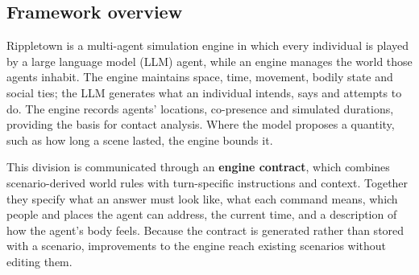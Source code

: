 %
%
%
%
%

\subsection{Framework overview}
\label{sec:methods:overview}

Rippletown is a multi-agent simulation engine in which every individual is played by a large language model (LLM) agent, while an engine manages the world those agents inhabit. The engine maintains space, time, movement, bodily state and social ties; the LLM generates what an individual intends, says and attempts to do. The engine records agents' locations, co-presence and simulated durations, providing the basis for contact analysis. Where the model proposes a quantity, such as how long a scene lasted, the engine bounds it.

This division is communicated through an \textbf{engine contract}, which combines scenario-derived world rules with turn-specific instructions and context. Together they specify what an answer must look like, what each command means, which people and places the agent can address, the current time, and a description of how the agent's body feels. Because the contract is generated rather than stored with a scenario, improvements to the engine reach existing scenarios without editing them.

